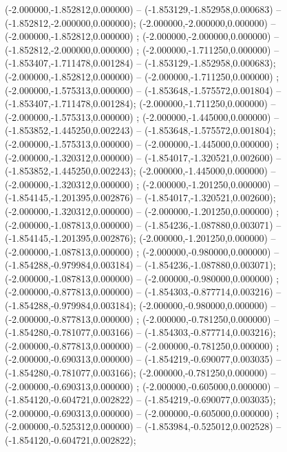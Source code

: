  (-2.000000,-1.852812,0.000000) -- (-1.853129,-1.852958,0.000683) -- (-1.852812,-2.000000,0.000000);
 (-2.000000,-2.000000,0.000000) -- (-2.000000,-1.852812,0.000000) ;
 (-2.000000,-2.000000,0.000000) -- (-1.852812,-2.000000,0.000000) ;
 (-2.000000,-1.711250,0.000000) -- (-1.853407,-1.711478,0.001284) -- (-1.853129,-1.852958,0.000683);
 (-2.000000,-1.852812,0.000000) -- (-2.000000,-1.711250,0.000000) ;
 (-2.000000,-1.575313,0.000000) -- (-1.853648,-1.575572,0.001804) -- (-1.853407,-1.711478,0.001284);
 (-2.000000,-1.711250,0.000000) -- (-2.000000,-1.575313,0.000000) ;
 (-2.000000,-1.445000,0.000000) -- (-1.853852,-1.445250,0.002243) -- (-1.853648,-1.575572,0.001804);
 (-2.000000,-1.575313,0.000000) -- (-2.000000,-1.445000,0.000000) ;
 (-2.000000,-1.320312,0.000000) -- (-1.854017,-1.320521,0.002600) -- (-1.853852,-1.445250,0.002243);
 (-2.000000,-1.445000,0.000000) -- (-2.000000,-1.320312,0.000000) ;
 (-2.000000,-1.201250,0.000000) -- (-1.854145,-1.201395,0.002876) -- (-1.854017,-1.320521,0.002600);
 (-2.000000,-1.320312,0.000000) -- (-2.000000,-1.201250,0.000000) ;
 (-2.000000,-1.087813,0.000000) -- (-1.854236,-1.087880,0.003071) -- (-1.854145,-1.201395,0.002876);
 (-2.000000,-1.201250,0.000000) -- (-2.000000,-1.087813,0.000000) ;
 (-2.000000,-0.980000,0.000000) -- (-1.854288,-0.979984,0.003184) -- (-1.854236,-1.087880,0.003071);
 (-2.000000,-1.087813,0.000000) -- (-2.000000,-0.980000,0.000000) ;
 (-2.000000,-0.877813,0.000000) -- (-1.854303,-0.877714,0.003216) -- (-1.854288,-0.979984,0.003184);
 (-2.000000,-0.980000,0.000000) -- (-2.000000,-0.877813,0.000000) ;
 (-2.000000,-0.781250,0.000000) -- (-1.854280,-0.781077,0.003166) -- (-1.854303,-0.877714,0.003216);
 (-2.000000,-0.877813,0.000000) -- (-2.000000,-0.781250,0.000000) ;
 (-2.000000,-0.690313,0.000000) -- (-1.854219,-0.690077,0.003035) -- (-1.854280,-0.781077,0.003166);
 (-2.000000,-0.781250,0.000000) -- (-2.000000,-0.690313,0.000000) ;
 (-2.000000,-0.605000,0.000000) -- (-1.854120,-0.604721,0.002822) -- (-1.854219,-0.690077,0.003035);
 (-2.000000,-0.690313,0.000000) -- (-2.000000,-0.605000,0.000000) ;
 (-2.000000,-0.525312,0.000000) -- (-1.853984,-0.525012,0.002528) -- (-1.854120,-0.604721,0.002822);
